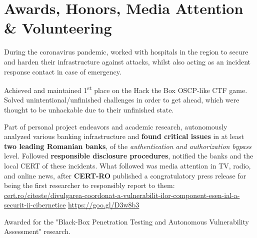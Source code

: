 \documentclass[11pt,a4paper,sans]{moderncv}
\renewcommand*{\httplink}[2][]{%
	\ifthenelse{\equal{#1}{}}%
	{\href{https://#2}{#2}}%
	{\href{https://#2}{#1}}}
\begin{document}
\section{Awards, Honors, Media Attention \& Volunteering}

	\vspace{-2pt} {\small{During the coronavirus pandemic, worked with hospitals in the region to secure and harden their infrastructure against attacks, whilst also acting as an incident response contact in case of emergency.}}
	
	\vspace{4pt}

	\vspace{-2pt} {\small{Achieved and maintained 1\textsuperscript{st} place on the Hack the Box OSCP-like CTF game. Solved unintentional/unfinished challenges in order to get ahead, which were thought to be unhackable due to their unfinished state.}}

	\vspace{4pt}

	\vspace{-2pt} {\small{Part of personal project endeavors and academic research, autonomously analyzed various banking infrastructure and \textbf{found critical issues} in at least \textbf{two leading Romanian banks}, of the \textit{authentication and authorization bypass} level. Followed \textbf{responsible disclosure procedures}, notified the banks and the local CERT of these incidents. What followed was media attention in TV, radio, and online news, after \textbf{CERT-RO} published a congratulatory press release for being the first researcher to responsibly report to them: \httplink[https://goo.gl/D3w8b3]{cert.ro/citeste/divulgarea-coordonat-a-vulnerabilit-ilor-component-esen-ial-a-securit-ii-cibernetice}}}

	\vspace{4pt}

	\vspace{-2pt} {\small{Awarded for the "Black-Box Penetration Testing and Autonomous Vulnerability Assessment" research.}}

	\vspace{4pt}
\end{document}
